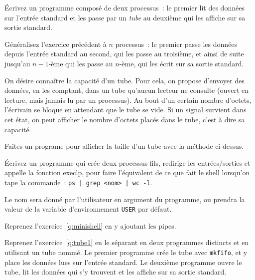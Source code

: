 %


% 


\question
    \label {q:tube1}

Écrivez un programme composé de deux processus~: le
premier lit des données sur l'entrée
standard et les passe par un {\em tube} au deuxième qui les
affiche sur sa sortie standard.


\question

Généralisez l'exercice précédent à $n$ processus~:  le premier passe les
données depuis l'entrée standard au second, qui les passe au troisième,
et ainsi de suite jusqu'au $n-1$-ème qui les passe au $n$-ème, qui les
écrit sur sa sortie standard.


\question

On désire connaître la capacité d'un tube.  Pour cela, on propose
d'envoyer des données, en les comptant, dans un tube qu'aucun lecteur ne
consulte (ouvert en lecture, mais jamais lu par un processus).  Au bout
d'un certain nombre d'octets, l'écrivain se bloque en attendant que le
tube se vide.  Si un signal survient dans cet état, on peut afficher le
nombre d'octets placés dans le tube, c'est à dire sa capacité.

Faites un programe pour afficher la taille d'un tube avec la méthode
ci-dessus.


\question

Écrivez un programme qui crée deux processus fils, redirige les
entrées/sorties et appelle la fonction execlp, pour faire l'équivalent
de ce que fait le shell lorsqu'on tape la commande~: {\tt ps |
grep <nom> | wc -l}.

Le nom sera donné par l'utilisateur en argument du programme, ou
prendra la valeur de la variable d'environnement {\tt USER} par défaut.

\question

Reprenez l'exercice~\ref {q:minishell} en y ajoutant les pipes.

\question

Reprenez l'exercice~\ref {q:tube1} en le séparant en deux
programmes distincts et en utilisant un tube nommé.  Le premier
programme crée le tube avec {\tt mkfifo}, et y place les données lues
sur l'entrée standard.  Le deuxième programme ouvre le tube, lit les
données qui s'y trouvent et les affiche sur sa sortie standard.


